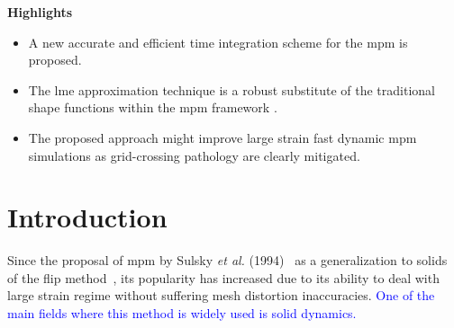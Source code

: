 \documentclass[preprint,12pt,a4paper]{elsarticle}
\begin{document}
\begin{frontmatter}
\setlength{\parskip}{1cm plus 5mm minus 4mm}
\setlength{\parskip}{1cm plus 5mm minus 4mm}
\large
\textbf{Highlights}
\normalsize
{\color{blue}
\begin{itemize}
\item A new accurate and efficient time integration scheme for the \acrshort{mpm} is proposed.
\item The \acrfull{lme} approximation technique is a robust substitute of the traditional shape functions within the \acrshort{mpm} framework .
\item The proposed approach might improve large strain fast dynamic \acrshort{mpm} simulations as grid-crossing pathology are clearly mitigated.  
\end{itemize}
}

\end{frontmatter}


\linenumbers

\section{Introduction}
\label{intro}
Since the proposal of \acrshort{mpm} by Sulsky {\it  et al.}
(1994)~\cite{Sulsky1994} as a generalization to solids of the \acrfull{flip} method~\cite{Brackbill1986}, its popularity
has increased due to its ability to deal with large strain regime
without suffering mesh distortion inaccuracies. \textcolor{blue}{One of the main fields where this method is widely used is solid dynamics.}
\end{document}
